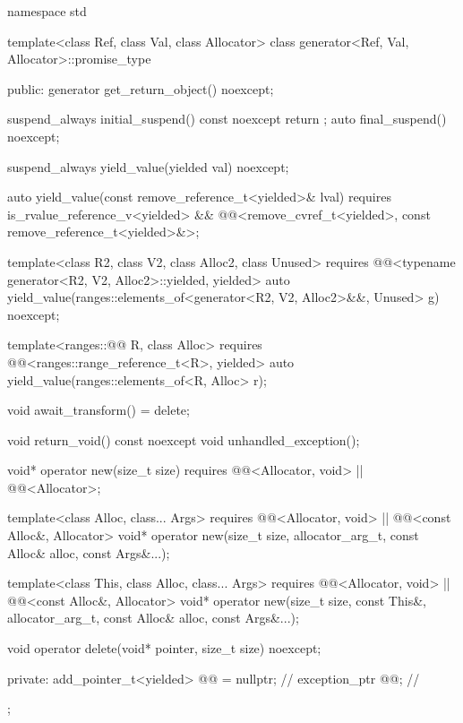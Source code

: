 \begin{codeblock}
namespace std {
  template<class Ref, class Val, class Allocator>
  class generator<Ref, Val, Allocator>::promise_type {
  public:
    generator get_return_object() noexcept;

    suspend_always initial_suspend() const noexcept { return {}; }
    auto final_suspend() noexcept;

    suspend_always yield_value(yielded val) noexcept;

    auto yield_value(const remove_reference_t<yielded>& lval)
      requires is_rvalue_reference_v<yielded> &&
        @@<remove_cvref_t<yielded>, const remove_reference_t<yielded>&>;

    template<class R2, class V2, class Alloc2, class Unused>
      requires @@<typename generator<R2, V2, Alloc2>::yielded, yielded>
        auto yield_value(ranges::elements_of<generator<R2, V2, Alloc2>&&, Unused> g) noexcept;

    template<ranges::@@ R, class Alloc>
      requires @@<ranges::range_reference_t<R>, yielded>
        auto yield_value(ranges::elements_of<R, Alloc> r);

    void await_transform() = delete;

    void return_void() const noexcept {}
    void unhandled_exception();

    void* operator new(size_t size)
      requires @@<Allocator, void> || @@<Allocator>;

    template<class Alloc, class... Args>
      requires @@<Allocator, void> || @@<const Alloc&, Allocator>
        void* operator new(size_t size, allocator_arg_t, const Alloc& alloc, const Args&...);

    template<class This, class Alloc, class... Args>
      requires @@<Allocator, void> || @@<const Alloc&, Allocator>
        void* operator new(size_t size, const This&, allocator_arg_t, const Alloc& alloc,
                           const Args&...);

    void operator delete(void* pointer, size_t size) noexcept;

  private:
    add_pointer_t<yielded> @@ = nullptr;    // \expos
    exception_ptr @@;                      // \expos
  };
}
\end{codeblock}

